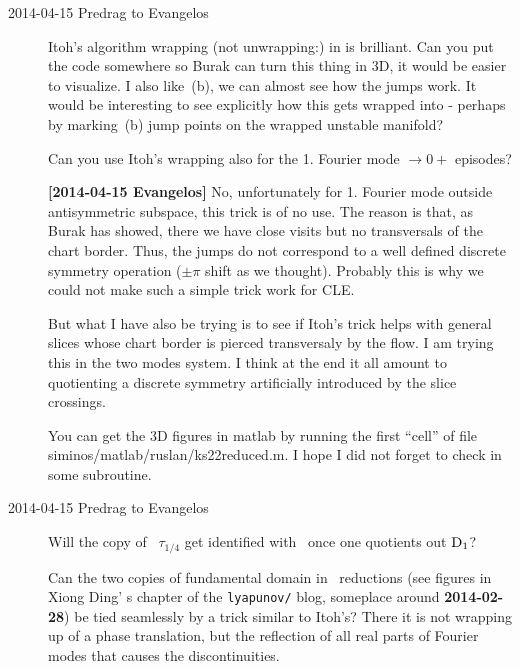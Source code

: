 \begin{description}
\item[2014-04-15 Predrag to Evangelos]
Itoh's algorithm wrapping (not unwrapping:) in
 is brilliant. Can you put the code
somewhere so Burak can turn this thing in 3D, it would be easier to
visualize. I also like \,(b), we can almost see
how the jumps work. It would be interesting to see explicitly how this
gets wrapped into  - perhaps by marking
\,(b) jump points on the wrapped unstable manifold?

Can you use Itoh's wrapping also for the 1. Fourier mode $\to 0+$ episodes?

{\bf [2014-04-15 Evangelos]} No, unfortunately for 1. Fourier mode outside
antisymmetric subspace, this trick is of no use.
The reason is that, as Burak has showed, there we have close visits but no transversals
of the chart border. Thus, the jumps do not correspond to a well defined
discrete symmetry operation ($\pm \pi$ shift as we thought).
Probably this is why we could not make such a
simple trick work for CLE.

But what I have also be trying is to see if Itoh's trick helps with general slices
whose chart border is pierced transversaly by the flow. I am trying this in
the two modes system. I think at the end it all amount to quotienting a discrete
symmetry artificially introduced by the slice crossings.

You can get the 3D figures in matlab by running the first ``cell'' of
file siminos/matlab/ruslan/ks22reduced.m. I hope I did not forget
to check in some subroutine.

\item[2014-04-15 Predrag to Evangelos] Will the copy of
\eqv\ $\tau_{1/4}$  get identified with \ once one
quotients out $\textrm{D}_{1}$?

Can the two copies of fundamental domain in \ reductions (see
figures in Xiong Ding' s chapter of the \texttt{lyapunov/} blog, someplace
around \textbf{2014-02-28}) be tied seamlessly by a trick similar to
Itoh's? There it is not wrapping up of a phase translation, but the
reflection of all real parts of Fourier modes that causes the
discontinuities.


\end{description}
